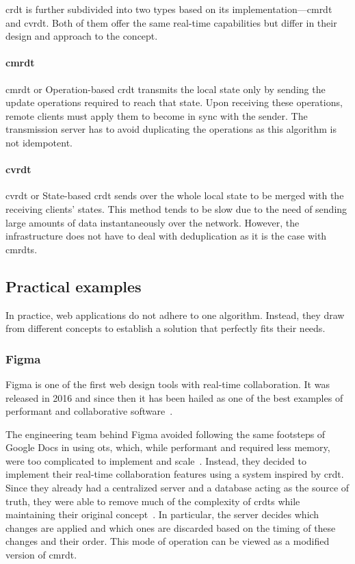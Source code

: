 \acrshort{crdt} is further subdivided into two types based on its implementation---\acrfull{cmrdt} and \acrfull{cvrdt}. Both of them offer the same real-time capabilities but differ in their design and approach to the concept.

\paragraph{\acrshort{cmrdt}}

\acrlong{cmrdt} or Operation-based \acrshort{crdt} transmits the local state only by sending the update operations required to reach that state.
Upon receiving these operations, remote clients must apply them to become in sync with the sender. The transmission server has to avoid duplicating the operations as this algorithm is not idempotent.

\paragraph{\acrshort{cvrdt}}

\acrlong{cvrdt} or State-based \acrshort{crdt} sends over the whole local state to be merged with the receiving clients' states. This method tends to be slow due to the need of sending large amounts of data instantaneously over the network. However, the infrastructure does not have to deal with deduplication as it is the case with \acrshort{cmrdt}s.

\subsection{Practical examples}

In practice, web applications do not adhere to one algorithm.
Instead, they draw from different concepts to establish a solution that perfectly fits their needs.

\subsubsection{Figma}


Figma is one of the first web design tools with real-time collaboration.
It was released in 2016 and since then it has been hailed as one of the best examples of performant and collaborative software~\autocite{tools_2020_nodate}.

The engineering team behind Figma avoided following the same footsteps of Google Docs in using \acrshort{ot}s, which, while performant and required less memory, were too complicated to implement and scale~\autocite{wallace_how_nodate}.
Instead, they decided to implement their real-time collaboration features using a system inspired by \acrshort{crdt}.
Since they already had a centralized server and a database acting as the source of truth, they were able to remove much of the complexity of \acrshort{crdt}s while maintaining their original concept~\autocite{wallace_how_nodate}.
In particular, the server decides which changes are applied and which ones are discarded based on the timing of these changes and their order.
This mode of operation can be viewed as a modified version of \acrshort{cmrdt}.

